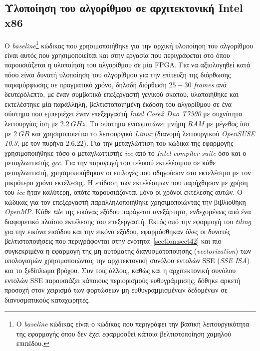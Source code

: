 \subsection[4.1.1 Υλοποίηση του αλγορίθμου σε αρχιτεκτονική Intel x86]{Υλοποίηση του αλγορίθμου σε αρχιτεκτονική Intel x86}
\label{subsection:sub411}
\indent
Ο \textsl{baseline}\footnote{\small Ο \textsl{baseline} κώδικας είναι ο κώδικας που περιγράφει την βασική λειτουργικότητα της εφαρμογής όπου δεν έχει εφαρμοσθεί κάποια βελτιστοποίηση χαμηλού επιπέδου.} κώδικας που χρησιμοποιήθηκε για την αρχική υλοποίηση του αλγορίθμου είναι αυτός που χρησιμοποιείται και στην εργασία που περιγράφεται στο \cite{BellasFCCM} όπου παρουσιάζεται η υλοποίηση του αλγορίθμου σε μία \ac{FPGA}.\newline \indent
Για να αξιολογηθεί κατά πόσο είναι δυνατή υλοποίηση του αλγορίθμου για την επίτευξη της διόρθωσης παραμόρφωσης σε πραγματικό χρόνο, δηλαδή διόρθωση \(25-30\) \textsl{frames} ανά δευτερόλεπτο, με έναν συμβατικό επεξεργαστή γενικού σκοπού, υλοποιήθηκε και εκτελέστηκε μία παράλληλη, βελτιστοποιημένη έκδοση του αλγορίθμου σε ένα σύστημα που εμπεριέχει έναν επεξεργαστή \textsl{Intel Core2 Duo Τ7500} με συχνότητα λειτουργίας ίση με \(2.2\ GHz\). Το σύστημα ενσωματώνει μνήμη \textsl{RAM} με μέγεθος ίσο με \(2\ GB\) και χρησιμοποιείται το λειτουργικό \textsl{Linux} (διανομή λειτουργικού \textsl{OpenSUSE 10.3}, με τον πυρήνα \(2.6.22\)). Για την μεταγλώττιση του κώδικα της εφαρμογής χρησιμοποιήθηκε τόσο ο μεταγλωττιστής \textsl{icc} από το \textsl{Intel compiler suite} \cite{intelcompilersuite} όσο και ο μεταγλωττιστής \textsl{gcc}. Για την παραγωγή του τελικού εκτελέσιμου σε κάθε μεταγλωττιστή, χρησιμοποιήθηκαν οι επιλογές που οδηγούσαν στο εκτελέσιμο με τον μικρότερο χρόνο εκτέλεσης. Η επίδοση των εκτελέσιμων που παρήχθησαν με χρήση του \textsl{icc} ήταν καλύτερη, οπότε παρουσιάζονται μόνο οι χρόνοι εκτέλεσης αυτών.\newline \indent
Ο κώδικας για τον επεξεργαστή παραλληλοποιήθηκε χρησιμοποιώντας την βιβλιοθήκη \textsl{OpenMP}. Κάθε \textsl{tile} της εικόνας εξόδου παράγεται ανεξάρτητα, ενδεχομένως από ένα διαφορετικό πλαίσιο εκτέλεσης του επεξεργαστή. Εκτός από την εφαρμογή του \textsl{tiling} για την εικόνα εισόδου και την εικόνα εξόδου, εφαρμόσθηκαν όλες οι δυνατές βελτιστοποιήσεις που περιγράφονται στην ενότητα~\ref{section:sect42} και πιο συγκεκριμένα η εφαρμογή της μη αυτόματης διανυσματοποίησης (\textsl{vectorization}) των υπολογισμών χρησιμοποιώντας την αρχιτεκτονική συνόλου εντολών \ac{SSE} (\textsl{SSE ISA}) \cite{intelssedevman} και το ξεδίπλωμα βρόχου. Συν τοις άλλοις, καθώς και η αρχιτεκτονική συνόλου εντολών \ac{SSE} παρουσιάζει κάποιους περιορισμούς ευθυγράμμισης, δόθηκε αρκετή προσοχή στον χειρισμό των φορτώσεων μη ευθυγραμμισμένων δεδομένων σε διανυσματικούς καταχωρητές.\newline \indent
